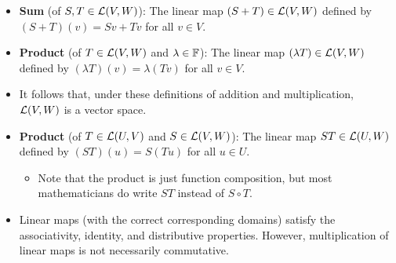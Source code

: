 \documentclass[../main.tex]{subfiles}
\begin{document}
\begin{itemize}
\begin{theorem}
\begin{proof}
\begin{align*}
                T(\lambda v) &= T(\lambda c_1v_1+\cdots+\lambda c_nv_n)\\
                &= \lambda c_1w_1+\cdots+\lambda c_nw_n\\
                &= \lambda Tv
            \end{align*}
            as desired.\par
            Now suppose $\tilde{T}\in\lin{V}{W}$ satisfies $\tilde{T}v_j=w_j$ for all $j=1,\dots,n$. To prove that $T=\tilde{T}$, it will suffice to show that $\tilde{T}(c_1v_1+\cdots+c_nv_n)=T(c_1v_1+\cdots+c_nv_n)$ for all $c_1v_1+\cdots+c_nv_n\in V$. Let $c_1v_1+\cdots+c_nv_n\in V$ be arbitrary. We know that $\tilde{T}(v_j)=w_j$ for all $j=1,\dots,n$. It follows since $\tilde{T}$ is a linear map (specifically, since it's homogenous) that $c_jw_j=c_j\tilde{T}(v_j)=\tilde{T}(c_jv_j)$ for all $j=1,\dots,n$. Similarly, the additivity of $\tilde{T}$ implies that
            \begin{align*}
                T(c_1v_1+\cdots+c_nv_n) &= c_1w_1+\cdots+c_nw_n\\
                &= \tilde{T}(c_1v_1)+\cdots+\tilde{T}(c_nv_n)\\
                &= \tilde{T}(c_1v_1+\cdots+c_nv_n)
            \end{align*}
            as desired.
        \end{proof}
    \end{theorem}
    \item \textbf{Sum} (of $S,T\in\mathcal{L}(V,W)$): The linear map $(S+T)\in\mathcal{L}(V,W)$ defined by $(S+T)(v)=Sv+Tv$ for all $v\in V$.
    \item \textbf{Product} (of $T\in\mathcal{L}(V,W)$ and $\lambda\in\mathbb{F}$): The linear map $(\lambda T)\in\mathcal{L}(V,W)$ defined by $(\lambda T)(v)=\lambda(Tv)$ for all $v\in V$.
    \item It follows that, under these definitions of addition and multiplication, $\mathcal{L}(V,W)$ is a vector space.
    \item \textbf{Product} (of $T\in\mathcal{L}(U,V)$ and $S\in\mathcal{L}(V,W)$): The linear map $ST\in\mathcal{L}(U,W)$ defined by $(ST)(u)=S(Tu)$ for all $u\in U$.
    \begin{itemize}
        \item Note that the product is just function composition, but most mathematicians do write $ST$ instead of $S\circ T$.
    \end{itemize}
    \item Linear maps (with the correct corresponding domains) satisfy the associativity, identity, and distributive properties. However, multiplication of linear maps is not necessarily commutative.

\end{itemize}
\end{document}
